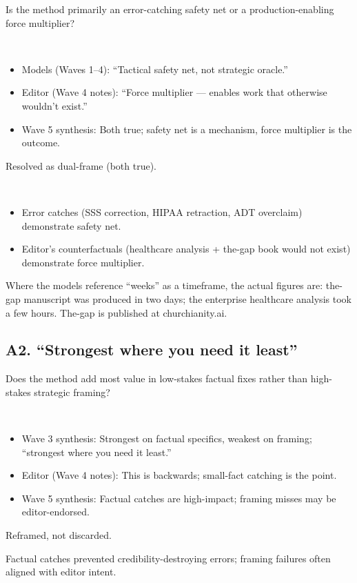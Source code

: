 \documentclass[11pt,letterpaper]{article}
\begin{document}
\begin{reflist}
\item[Dispute:] Is the method primarily an error-catching safety net or a production-enabling force multiplier?
\item[Positions:]~
  \begin{itemize}[nosep]
    \item Models (Waves 1--4): ``Tactical safety net, not strategic oracle.''
    \item Editor (Wave 4 notes): ``Force multiplier --- enables work that otherwise wouldn't exist.''
    \item Wave 5 synthesis: Both true; safety net is a mechanism, force multiplier is the outcome.
  \end{itemize}
\item[Status:] Resolved as dual-frame (both true).
\item[Evidence:]~
  \begin{itemize}[nosep]
    \item Error catches (SSS correction, HIPAA retraction, ADT overclaim) demonstrate safety net.
    \item Editor's counterfactuals (healthcare analysis + the-gap book would not exist) demonstrate force multiplier.
  \end{itemize}
\item[Note:] Where the models reference ``weeks'' as a timeframe, the actual figures are: the-gap manuscript was produced in two days; the enterprise healthcare analysis took a few hours. The-gap is published at churchianity.ai.
\end{reflist}

\subsection{A2. ``Strongest where you need it least''}

\begin{reflist}
\item[Dispute:] Does the method add most value in low-stakes factual fixes rather than high-stakes strategic framing?
\item[Positions:]~
  \begin{itemize}[nosep]
    \item Wave 3 synthesis: Strongest on factual specifics, weakest on framing; ``strongest where you need it least.''
    \item Editor (Wave 4 notes): This is backwards; small-fact catching is the point.
    \item Wave 5 synthesis: Factual catches are high-impact; framing misses may be editor-endorsed.
  \end{itemize}
\item[Status:] Reframed, not discarded.
\item[Evidence:] Factual catches prevented credibility-destroying errors; framing failures often aligned with editor intent.
\end{reflist}
\end{document}
